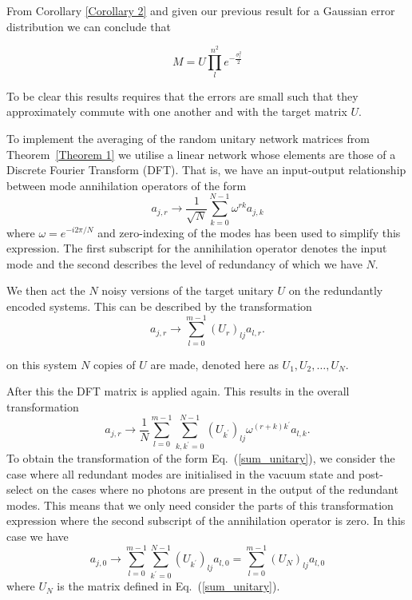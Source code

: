 \documentclass[aps,pra,twocolumn,superscriptaddress,numerical]{revtex4-1}
\begin{document}
From Corollary \ref{Corollary 2} and given our previous result for a Gaussian error distribution we can conclude that

\begin{equation}
M = U\prod_{l}^{n^2}e^{-\frac{\sigma_{l}^{2}}{2}}
\end{equation}

To be clear this results requires that the errors are small such that they approximately commute with one another and with the target matrix $U$.
 
To implement the averaging of the random unitary network matrices from Theorem~\ref{Theorem 1} we utilise a linear network whose elements are those of a Discrete Fourier Transform (DFT).  That is, we have an input-output relationship between mode annihilation operators of the form
\begin{equation}
	a_{j,r} \rightarrow \frac{1}{\sqrt{N}} \sum_{k=0}^{N-1} \omega^{rk} a_{j,k}	
\end{equation}
where $\omega = e^{-i2\pi /N}$ and zero-indexing of the modes has been used to simplify this expression.  The first subscript for the annihilation operator denotes the input mode and the second describes the level of redundancy of which we have $N$.

We then act the $N$ noisy versions of the target unitary $U$ on the redundantly encoded systems.  This can be described by the transformation
\begin{equation}
	a_{j,r} \rightarrow \sum_{l=0}^{m-1} (U_r)_{lj} a_{l,r}.
\end{equation}

on this system $N$ copies of $U$ are made, denoted here as $U_1, U_2, \ldots, U_N$. 

After this the DFT matrix is applied again.  This results in the overall transformation
\begin{equation}
	a_{j,r} \rightarrow \frac{1}{N} 
	\sum_{l=0}^{m-1} \sum_{k,k^\prime=0}^{N-1}
	(U_{k^\prime})_{lj} \omega^{(r+k)k^\prime} a_{l,k}.
\end{equation}
To obtain the transformation of the form Eq.~(\ref{sum_unitary}), we consider the case where all redundant modes are initialised in the vacuum state and post-select on the cases where no photons are present in the output of the redundant modes.  This means that we only need consider the parts of this transformation expression where the second subscript of the annihilation operator is zero.  In this case we have
\begin{equation}
	\label{sum_transformation}
	a_{j,0} \rightarrow \sum_{l=0}^{m-1} \sum_{k^\prime=0}^{N-1}
	(U_{k^\prime})_{lj} a_{l,0} = \sum_{l=0}^{m-1} (U_N)_{lj} a_{l,0}
\end{equation}
where $U_N$ is the matrix defined in Eq.~(\ref{sum_unitary}).
\end{document}
